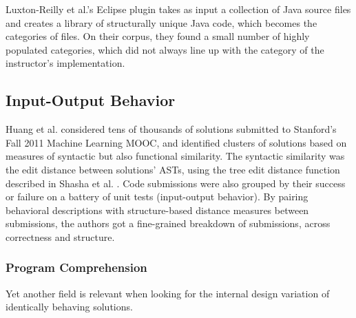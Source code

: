 Luxton-Reilly et al.'s Eclipse plugin takes as input a collection of Java source files and creates a library of structurally unique Java code, which becomes the categories of files. On their corpus, they found a small number of highly populated categories, which did not always line up with the category of the instructor's implementation.

\subsection{Input-Output Behavior}

Huang et al. \cite{MOOCshop} considered tens of thousands of solutions submitted to Stanford's Fall 2011 Machine Learning MOOC, and identified clusters of solutions based on measures of syntactic but also functional similarity. The syntactic similarity was the edit distance between solutions' ASTs, using the tree edit distance function described in Shasha et al. \cite{shasha1994exact}. Code submissions were also grouped by their success or failure on a battery of unit tests (input-output behavior). By pairing behavioral descriptions with structure-based distance measures between submissions, the authors got a fine-grained breakdown of submissions, across correctness and structure.

\subsubsection{Program Comprehension}

Yet another field is relevant when looking for the internal design variation of identically behaving solutions. 









